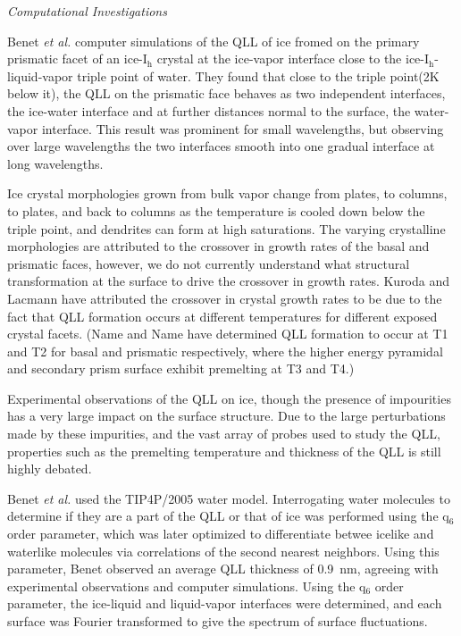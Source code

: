 \begin{flushleft}
\textit{Computational Investigations}
\end{flushleft}

Benet \textit{et al.} computer simulations of the QLL of ice fromed on
the primary prismatic facet of an ice-I$_\mathrm{h}$ crystal at the
ice-vapor interface close to the ice-I$_\mathrm{h}$-liquid-vapor
triple point of water.\cite{Benet2016} They found that close to the
triple point(2K below it), the QLL on the prismatic face behaves as
two independent interfaces, the ice-water interface and at further
distances normal to the surface, the water-vapor interface. This
result was prominent for small wavelengths, but observing over large
wavelengths the two interfaces smooth into one gradual interface at
long wavelengths.

Ice crystal morphologies grown from bulk vapor change from plates, to
columns, to plates, and back to columns as the temperature is cooled
down below the triple point, and dendrites can form at high
saturations.\cite{K. G. Libbrecht, Rep. Prog. Phys. 68, 855 (2005).}
The varying crystalline morphologies are attributed to the crossover
in growth rates of the basal and prismatic faces, however, we do not
currently understand what structural transformation at the surface to
drive the crossover in growth rates.\cite{1,2,4,5} Kuroda and Lacmann
have attributed the crossover in crystal growth rates to be due to the
fact that QLL formation occurs at different temperatures for different
exposed crystal facets.\cite{6} (Name and Name have determined QLL
formation to occur at T1 and T2 for basal and prismatic respectively,
where the higher energy pyramidal and secondary prism surface exhibit
premelting at T3 and T4.)

Experimental observations of the QLL on ice\cite{8-14}, though the
presence of impourities has a very large impact on the surface
structure.\cite{12,15} Due to the large perturbations made by these
impurities, and the vast array of probes used to study the QLL,
properties such as the premelting temperature and thickness of the QLL
is still highly debated.\cite{8} 

Benet \textit{et al.} used the TIP4P/2005 water model. Interrogating
water molecules to determine if they are a part of the QLL or that of
ice was performed using the q$_{6}$ order parameter\cite{42}, which
was later optimized to differentiate betwee icelike and waterlike
molecules via correlations of the second nearest neighbors.\cite{43}
Using this parameter, Benet observed an average QLL thickness of
0.9~nm, agreeing with experimental observations\cite{12,14} and
computer simulations.\cite{38-40} Using the q$_{6}$ order parameter,
the ice-liquid and liquid-vapor interfaces were determined, and each
surface was Fourier transformed to give the spectrum of surface
fluctuations.

